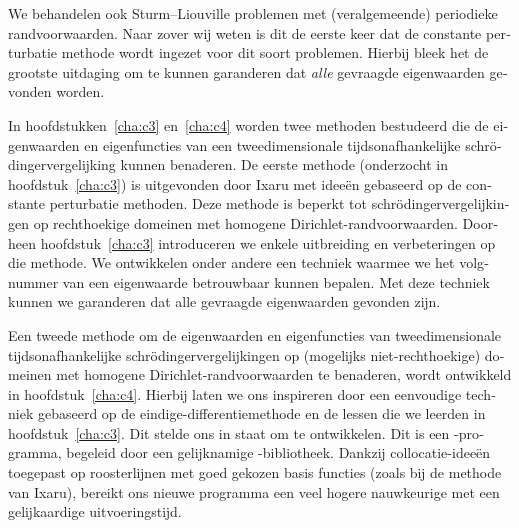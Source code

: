 \begin{otherlanguage}{dutch}
We behandelen ook Sturm--Liouville problemen met (veralgemeende) periodieke randvoorwaarden. Naar zover wij weten is dit de eerste keer dat de constante perturbatie methode wordt ingezet voor dit soort problemen. Hierbij bleek het de grootste uitdaging om te kunnen garanderen dat \emph{alle} gevraagde eigenwaarden gevonden worden.

In hoofdstukken~\ref{cha:c3} en~\ref{cha:c4} worden twee methoden bestudeerd die de eigenwaarden en eigenfuncties van een tweedimensionale tijdsonafhankelijke schrödingervergelijking kunnen benaderen. De eerste methode (onderzocht in hoofdstuk~\ref{cha:c3}) is uitgevonden door Ixaru met ideeën gebaseerd op de constante perturbatie methoden. Deze methode is beperkt tot schrödingervergelijkingen op rechthoekige domeinen met homogene Dirichlet-randvoorwaarden. Doorheen hoofdstuk~\ref{cha:c3} introduceren we enkele uitbreiding en verbeteringen op die methode. We ontwikkelen onder andere een techniek waarmee we het volgnummer van een eigenwaarde betrouwbaar kunnen bepalen. Met deze techniek kunnen we garanderen dat alle gevraagde eigenwaarden gevonden zijn.

Een tweede methode om de eigenwaarden en eigenfuncties van tweedimensionale tijdsonafhankelijke schrödingervergelijkingen op (mogelijks niet-rechthoekige) domeinen met homogene Dirichlet-randvoorwaarden te benaderen, wordt ontwikkeld in hoofdstuk~\ref{cha:c4}. Hierbij laten we ons inspireren door een eenvoudige techniek gebaseerd op de eindige-differentiemethode en de lessen die we leerden in hoofdstuk~\ref{cha:c3}. Dit stelde ons in staat om \strands{} te ontwikkelen. Dit is een \cpp{}-programma, begeleid door een gelijknamige \lpython{}-bibliotheek. Dankzij collocatie-ideeën toegepast op roosterlijnen met goed gekozen basis functies (zoals bij de methode van Ixaru), bereikt ons nieuwe programma een veel hogere nauwkeurige met een gelijkaardige uitvoeringstijd. 

\end{otherlanguage}

\stopchapter
